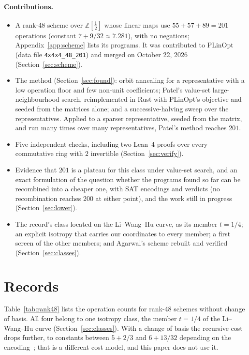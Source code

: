 \documentclass[11pt]{article}
\theoremstyle{remark}
\newcommand{\Z}{\mathbb{Z}}
\newcommand{\Zh}{\Z[\tfrac12]}
\begin{document}
\paragraph{Contributions.}
\begin{itemize}
\item A rank-48 scheme over $\Zh$ whose linear maps use
  $55+57+89=201$ operations (constant $7+9/32\approx7.281$), with no
  negations; Appendix~\ref{app:scheme} lists its programs.  It was
  contributed to PLinOpt (data file \texttt{4x4x4\_48\_201}) and
  merged on October 22, 2026 (Section~\ref{sec:scheme}).
\item The method (Section~\ref{sec:found}): orbit annealing for a
  representative with a low operation floor and few non-unit
  coefficients; Patel's value-set large-neighbourhood search,
  reimplemented in Rust with PLinOpt's objective and seeded from the
  matrices alone; and a successive-halving sweep over the
  representatives.  Applied to a sparser representative, seeded from the
  matrix, and run many times over many representatives, Patel's method
  reaches $201$.
\item Five independent checks, including two Lean~4 proofs over every
  commutative ring with $2$ invertible (Section~\ref{sec:verify}).
\item Evidence that $201$ is a plateau for this class under value-set
  search, and an exact formulation of the question whether the programs
  found so far can be recombined into a cheaper one, with SAT
  encodings and verdicts (no recombination reaches $200$ at either
  point), and the work still in progress
  (Section~\ref{sec:lower}).
\item The record's class located on the Li--Wang--Hu curve, as its
  member $t=1/4$; an explicit isotropy that carries our coordinates to
  every member; a first screen of the other members; and Agarwal's
  scheme rebuilt and verified (Section~\ref{sec:classes}).
\end{itemize}

\section{Records}\label{sec:records}

Table~\ref{tab:rank48} lists the operation counts for rank-48 schemes
without change of basis.  All four belong to one isotropy class, the
member $t=1/4$ of the Li--Wang--Hu curve (Section~\ref{sec:classes}).
With a change of basis the recursive cost drops further, to constants
between $5+2/3$ and $6+13/32$ depending on the encoding~\cite{DPSST26};
that is a different cost model, and this paper does not use it.
\end{document}
